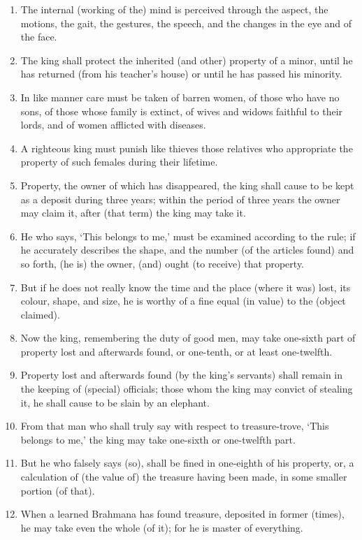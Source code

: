 \begin{enumerate}
\item The internal (working of the) mind is perceived through the aspect, the motions, the gait, the gestures, the speech, and the changes in the eye and of the face.
\item The king shall protect the inherited (and other) property of a minor, until he has returned (from his teacher's house) or until he has passed his minority.
\item In like manner care must be taken of barren women, of those who have no sons, of those whose family is extinct, of wives and widows faithful to their lords, and of women afflicted with diseases.
\item A righteous king must punish like thieves those relatives who appropriate the property of such females during their lifetime.
\item Property, the owner of which has disappeared, the king shall cause to be kept as a deposit during three years; within the period of three years the owner may claim it, after (that term) the king may take it.
\item He who says, `This belongs to me,' must be examined according to the rule; if he accurately describes the shape, and the number (of the articles found) and so forth, (he is) the owner, (and) ought (to receive) that property.
\item But if he does not really know the time and the place (where it was) lost, its colour, shape, and size, he is worthy of a fine equal (in value) to the (object claimed).
\item Now the king, remembering the duty of good men, may take one-sixth part of property lost and afterwards found, or one-tenth, or at least one-twelfth.
\item Property lost and afterwards found (by the king's servants) shall remain in the keeping of (special) officials; those whom the king may convict of stealing it, he shall cause to be slain by an elephant.
\item From that man who shall truly say with respect to treasure-trove, `This belongs to me,' the king may take one-sixth or one-twelfth part.
\item But he who falsely says (so), shall be fined in one-eighth of his property, or, a calculation of (the value of) the treasure having been made, in some smaller portion (of that).
\item When a learned Brahmana has found treasure, deposited in former (times), he may take even the whole (of it); for he is master of everything.

\end{enumerate}
